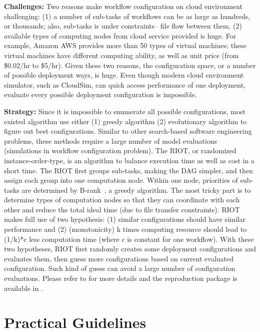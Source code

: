 \documentclass[sigconf,anonymous,review]{acmart}
\begin{document}
\noindent\textbf{Challenges: } 
Two reasons make workflow configuration on cloud environment challenging: (1)  a number of sub-tasks of workflows can be as large as hundreds, or thousands; also, sub-tasks is under constraints-- file flow between them. (2) available types of
computing nodes from cloud service provided is huge.
For example, Amazon AWS provides more than 50 types of virtual machines; these
virtual machines have different computing ability, as well as unit price (from \$0.02/hr to \$5/hr).
Given these two reasons,
the configuration space, or a number of possible deployment ways, is huge.
Even though modern cloud environment simulator, such as CloudSim, can quick
access performance of one deployment, evaluate every
possible deployment configuration is impossible.

\noindent\textbf{Strategy:} 
Since it is impossible to enumerate all possible configurations, most existed algorithm use either (1) greedy algorithm (2) evolutionary algorithm to figure out best configurations.
Similar to other search-based software engineering problems,
these methods require a large number of model evaluations (simulations in workflow configuration problem).
The RIOT, or randomized instance-order-type, is an algorithm to balance execution time as well as cost
in a short time.
The RIOT first groups sub-tasks, making the DAG simpler, and then
assign each group into one computation node. Within one node,
priorities of sub-tasks are determined by
B-rank~\cite{topcuoglu2002performance}, a greedy algorithm. 
The most tricky part is to determine types of computation nodes so that they can coordinate with each other and reduce the total ideal time (due to file transfer constraints).
RIOT makes full use of two hypothesis: (1) similar configurations should have similar performance and (2) (monotonicity) k times computing resource should lead to (1/k)*c less computation time (where c is constant for one workflow).
With these two hypotheses,
RIOT first randomly creates some deployment configurations and evaluates them, then guess more configurations based on current evaluated configuration. Such kind of guess can avoid a large number of configuration evaluations. Please refer to \cite{chen2017riot} for more details and the reproduction package is available in .


\section{Practical Guidelines} \label{sec:guide}
\end{document}
